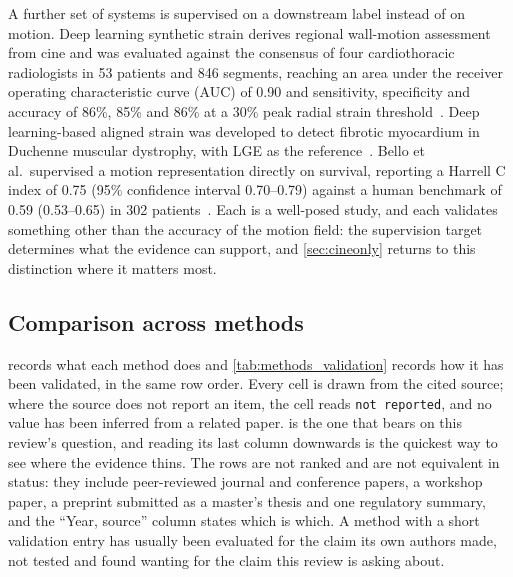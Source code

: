 A further set of systems is supervised on a downstream label instead of on motion. Deep learning
synthetic strain derives regional wall-motion assessment from cine and was evaluated against the
consensus of four cardiothoracic radiologists in 53 patients and 846 segments, reaching an area under
the receiver operating characteristic curve (AUC) of 0.90 and sensitivity, specificity and accuracy
of 86\%, 85\% and 86\% at a 30\% peak radial strain threshold~\citep{masutani2023dlss}. Deep
learning-based aligned strain was developed to detect fibrotic myocardium in Duchenne muscular
dystrophy, with LGE as the reference~\citep{koehler2025alignedstrain}. Bello et al.\ supervised a
motion representation directly on survival, reporting a Harrell C index of 0.75 (95\% confidence
interval 0.70--0.79) against a human benchmark of 0.59 (0.53--0.65) in 302
patients~\citep{bello2019}. Each is a well-posed study, and each validates something other than the
accuracy of the motion field: the supervision target determines what the evidence can support, and
\cref{sec:cineonly} returns to this distinction where it matters most.

\subsection{Comparison across methods}\label{sec:method_table}

 records what each method does and \cref{tab:methods_validation} records how
it has been validated, in the same row order. Every cell is drawn from the cited source; where the
source does not report an item, the cell reads \texttt{not reported}, and no value has been inferred
from a related paper.  is the one that bears on this review's question,
and reading its last column downwards is the quickest way to see where the evidence thins. The rows
are not ranked and are not equivalent in status: they include peer-reviewed journal and conference
papers, a workshop paper, a preprint submitted as a master's thesis and one regulatory summary, and
the \enquote{Year, source} column states which is which. A method with a short validation entry has
usually been evaluated for the claim its own authors made, not tested and found wanting for the
claim this review is asking about.

